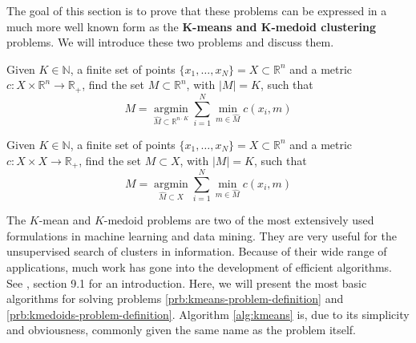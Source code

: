 The goal of this section is to prove that these problems can be expressed in a much more well known form as the \textbf{$\mathbf{K}$-means and $\mathbf{K}$-medoid clustering} problems.
We will introduce these two problems and discuss them.
\begin{problem}
  \label{prb:kmeans-problem-definition}
  Given $K\in \mathbb{N}$, a finite set of points $\{x_1,\ldots , x_N\} = X\subset\mathbb{R}^n$ and a metric $c:X\times \mathbb{R}^n\rightarrow\mathbb{R}_+$, find the set $M\subset\mathbb{R}^{n}$, with $|M|=K$, such that
  \begin{equation}
    \label{eq:kmeans-problem-definition}
    M = \underset{\hat{M}\subset\mathbb{R}^{n\cdot K}}{\operatorname{argmin}} \sum_{i=1}^N\min\limits_{m\in \hat{M}}c(x_i, m)
  \end{equation}
\end{problem}
\begin{problem}
  \label{prb:kmedoids-problem-definition}
  Given $K\in \mathbb{N}$, a finite set of points $\{x_1,\ldots , x_N\} = X\subset\mathbb{R}^n$ and a metric $c:X\times X\rightarrow\mathbb{R}_+$, find the set $M\subset X$, with $|M|=K$, such that
  \begin{equation}
    \label{eq:kmedoids-problem-definition}
    M = \underset{\hat{M}\subset X}{\operatorname{argmin}} \sum_{i=1}^N\min\limits_{m\in \hat{M}}c(x_i, m)
  \end{equation} 
\end{problem}
The $K$-mean and $K$-medoid problems are two of the most extensively used formulations in machine learning and data mining. 
They are very useful for the unsupervised search of clusters in information. 
Because of their wide range of applications, much work has gone into the development of efficient algorithms. See \cite{Bishop2006}, section 9.1 for an introduction. 
Here, we will present the most basic algorithms for solving problems \ref{prb:kmeans-problem-definition} and \ref{prb:kmedoids-problem-definition}. Algorithm \ref{alg:kmeans} is, due to its simplicity and obviousness, commonly given the same name as the problem itself. 

